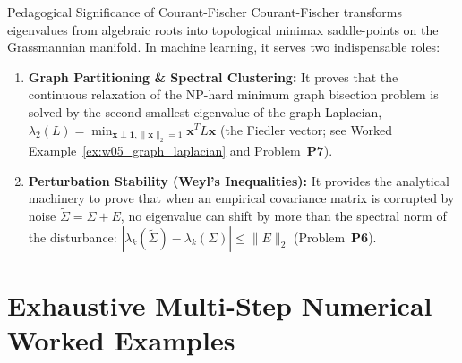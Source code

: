 \begin{intuitionbox}{Pedagogical Significance of Courant-Fischer}
Courant-Fischer transforms eigenvalues from algebraic roots into topological minimax saddle-points on the Grassmannian manifold. In machine learning, it serves two indispensable roles:
\begin{enumerate}
    \item \textbf{Graph Partitioning \& Spectral Clustering:} It proves that the continuous relaxation of the NP-hard minimum graph bisection problem is solved by the second smallest eigenvalue of the graph Laplacian, $\lambda_2(L) = \min_{\mathbf{x} \perp \mathbf{1}, \|\mathbf{x}\|_2=1} \mathbf{x}^T L \mathbf{x}$ (the Fiedler vector; see Worked Example~\ref{ex:w05_graph_laplacian} and Problem~\textbf{P7}).
    \item \textbf{Perturbation Stability (Weyl's Inequalities):} It provides the analytical machinery to prove that when an empirical covariance matrix is corrupted by noise $\tilde{\Sigma} = \Sigma + E$, no eigenvalue can shift by more than the spectral norm of the disturbance: $|\lambda_k(\tilde{\Sigma}) - \lambda_k(\Sigma)| \le \|E\|_2$ (Problem~\textbf{P6}).
\end{enumerate}
\end{intuitionbox}


\section{Exhaustive Multi-Step Numerical Worked Examples}

